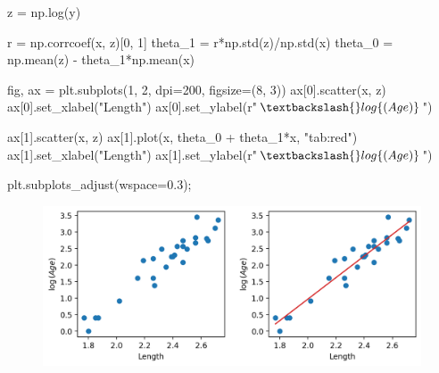 \documentclass[
  letterpaper,
  DIV=11,
  numbers=noendperiod]{scrreprt}
\newenvironment{Shaded}{\begin{snugshade}}{\end{snugshade}}
\newcommand{\DecValTok}[1]{\textcolor[rgb]{0.68,0.00,0.00}{#1}}
\newcommand{\FloatTok}[1]{\textcolor[rgb]{0.68,0.00,0.00}{#1}}
\newcommand{\NormalTok}[1]{\textcolor[rgb]{0.00,0.23,0.31}{#1}}
\newcommand{\OperatorTok}[1]{\textcolor[rgb]{0.37,0.37,0.37}{#1}}
\newcommand{\StringTok}[1]{\textcolor[rgb]{0.13,0.47,0.30}{#1}}
\newcommand{\VerbatimStringTok}[1]{\textcolor[rgb]{0.13,0.47,0.30}{#1}}
\begin{document}
\begin{Shaded}
\begin{Highlighting}[]
\NormalTok{z }\OperatorTok{=}\NormalTok{ np.log(y)}

\NormalTok{r }\OperatorTok{=}\NormalTok{ np.corrcoef(x, z)[}\DecValTok{0}\NormalTok{, }\DecValTok{1}\NormalTok{]}
\NormalTok{theta\_1 }\OperatorTok{=}\NormalTok{ r}\OperatorTok{*}\NormalTok{np.std(z)}\OperatorTok{/}\NormalTok{np.std(x)}
\NormalTok{theta\_0 }\OperatorTok{=}\NormalTok{ np.mean(z) }\OperatorTok{{-}}\NormalTok{ theta\_1}\OperatorTok{*}\NormalTok{np.mean(x)}

\NormalTok{fig, ax }\OperatorTok{=}\NormalTok{ plt.subplots(}\DecValTok{1}\NormalTok{, }\DecValTok{2}\NormalTok{, dpi}\OperatorTok{=}\DecValTok{200}\NormalTok{, figsize}\OperatorTok{=}\NormalTok{(}\DecValTok{8}\NormalTok{, }\DecValTok{3}\NormalTok{))}
\NormalTok{ax[}\DecValTok{0}\NormalTok{].scatter(x, z)}
\NormalTok{ax[}\DecValTok{0}\NormalTok{].set\_xlabel(}\StringTok{"Length"}\NormalTok{)}
\NormalTok{ax[}\DecValTok{0}\NormalTok{].set\_ylabel(}\VerbatimStringTok{r"$\textbackslash{}log\{(Age)\}$"}\NormalTok{)}

\NormalTok{ax[}\DecValTok{1}\NormalTok{].scatter(x, z)}
\NormalTok{ax[}\DecValTok{1}\NormalTok{].plot(x, theta\_0 }\OperatorTok{+}\NormalTok{ theta\_1}\OperatorTok{*}\NormalTok{x, }\StringTok{"tab:red"}\NormalTok{)}
\NormalTok{ax[}\DecValTok{1}\NormalTok{].set\_xlabel(}\StringTok{"Length"}\NormalTok{)}
\NormalTok{ax[}\DecValTok{1}\NormalTok{].set\_ylabel(}\VerbatimStringTok{r"$\textbackslash{}log\{(Age)\}$"}\NormalTok{)}

\NormalTok{plt.subplots\_adjust(wspace}\OperatorTok{=}\FloatTok{0.3}\NormalTok{)}\OperatorTok{;}
\end{Highlighting}
\end{Shaded}

\begin{figure}[H]

{\centering \includegraphics{constant_model_loss_transformations/loss_transformations_files/figure-pdf/cell-7-output-1.png}

}

\end{figure}
\end{document}
